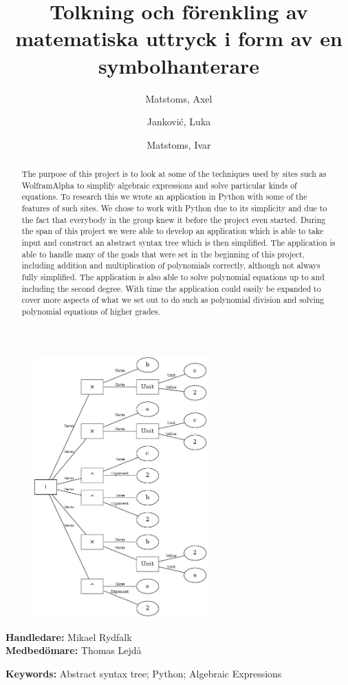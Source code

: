 \documentclass[12pt,a4paper]{article}
\author{
  Matstoms, Axel
  \and
  Jankovi\'{c}, Luka
  \and
  Matstoms, Ivar
}
\title{Tolkning och förenkling av matematiska uttryck i form av en symbolhanterare}
\begin{document}
\maketitle
\begin{figure}[h]
  \centering
  \includegraphics[width=0.6\textwidth]{image27}
\end{figure}
\begin{center}
  \textbf{Handledare: }Mikael Rydfalk\\
  \textbf{Medbedömare: }Thomas Lejdå
\end{center}
\newpage
{}
\begin{abstract}
The purpose of this project is to look at some of the techniques used by sites such as WolframAlpha to simplify algebraic expressions and solve particular kinds of equations. To research this we wrote an application in Python with some of the features of such sites.  We chose to work with Python due to its simplicity and due to the fact that everybody in the group knew it before the project even started. During the span of this project we were able to develop an application which is able to take input and construct an abstract syntax tree which is then simplified. The application is able to handle many of the goals that were set in the beginning of this project, including addition and multiplication of polynomials correctly, although not always fully simplified. The application is also able to solve polynomial equations up to and including the second degree. With time the application could easily be expanded to cover more aspects of what we set out to do such as polynomial division and solving polynomial equations of higher grades.
\end{abstract}
\textbf{Keywords:} Abstract syntax tree; Python; Algebraic Expressions
\newpage
\tableofcontents
\newpage
\end{document}
